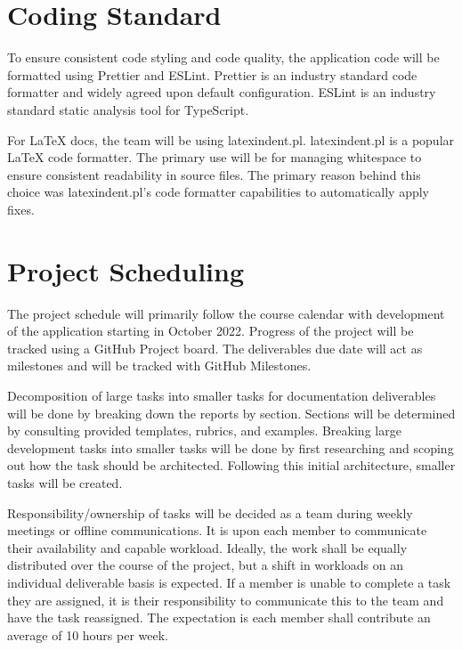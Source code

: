 \documentclass{article}
\begin{document}
\section{Coding Standard}

To ensure consistent code styling and code quality, the application code will be formatted using
Prettier and ESLint. Prettier is an industry standard code formatter and widely agreed upon default
configuration. ESLint is an industry standard static analysis tool for TypeScript.

For \LaTeX{} docs, the team will be using latexindent.pl. latexindent.pl is a popular \LaTeX{} code
formatter. The primary use will be for managing whitespace to ensure consistent readability in
source files. The primary reason behind this choice was latexindent.pl's code formatter
capabilities to automatically apply fixes.

\section{Project Scheduling}

The project schedule will primarily follow the course calendar with development of the application
starting in October 2022. Progress of the project will be tracked using a GitHub Project board. The
deliverables due date will act as milestones and will be tracked with GitHub Milestones.

Decomposition of large tasks into smaller tasks for documentation deliverables will be done by
breaking down the reports by section. Sections will be determined by consulting provided templates,
rubrics, and examples. Breaking large development tasks into smaller tasks will be done by first
researching and scoping out how the task should be architected. Following this initial
architecture, smaller tasks will be created.

Responsibility/ownership of tasks will be decided as a team during weekly meetings or offline
communications. It is upon each member to communicate their availability and capable workload.
Ideally, the work shall be equally distributed over the course of the project, but a shift in
workloads on an individual deliverable basis is expected. If a member is unable to complete a task
they are assigned, it is their responsibility to communicate this to the team and have the task
reassigned. The expectation is each member shall contribute an average of 10 hours per week.
\end{document}
